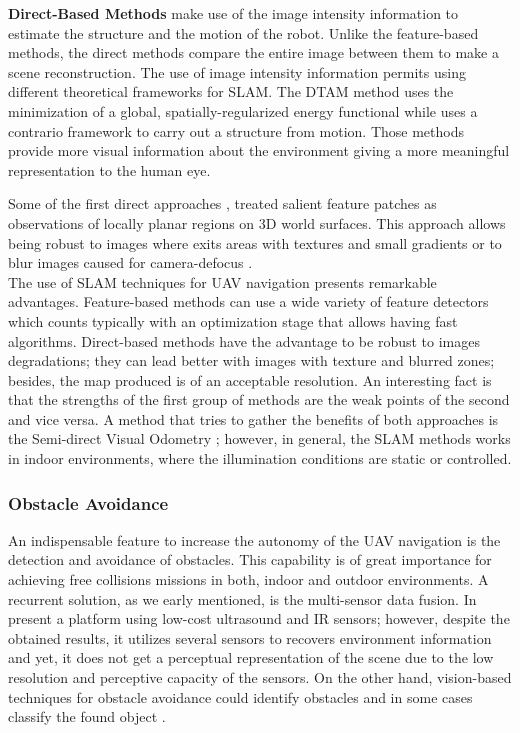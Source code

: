 \textbf{Direct-Based Methods} make use of the image intensity information to estimate the structure and the motion of the robot. Unlike the feature-based methods, the direct methods compare the entire image between them to make a scene reconstruction. The use of image intensity information permits using different theoretical frameworks for SLAM. The DTAM method \cite{Newcombe.Lovegrove.ea:ICCV:2011} uses the minimization of a global, spatially-regularized energy functional while \cite{Moulon.Monasse.ea:ACCV:2012} uses a contrario framework to carry out a structure from motion.
Those methods provide more visual information about the environment giving a more meaningful representation to the human eye. 

Some of the first direct approaches \cite{Jin.Favaro.ea:VC:2003}, \cite{Molton.Davison.ea:BMVC:2004} treated salient feature patches as observations of locally planar regions on 3D world surfaces. This approach allows being robust to images where exits areas with textures and small gradients \cite{Lovegrove.Davison.ea:IVS:2011} or to blur images caused for camera-defocus \cite{Newcombe.Lovegrove.ea:ICCV:2011}.\\

The use of SLAM techniques for UAV navigation presents remarkable advantages. Feature-based methods can use a wide variety of feature detectors which counts typically with an optimization stage that allows having fast algorithms. Direct-based methods have the advantage to be robust to images degradations; they can lead better with images with texture and blurred zones; besides, the map produced is of an acceptable resolution. An interesting fact is that the strengths of the first group of methods are the weak points of the second and vice versa. A method that tries to gather the benefits of both approaches is the Semi-direct Visual Odometry \cite{Forster.Pizzoli.ea:ICRA:2014}; however, in general, the SLAM methods works in indoor environments, where the illumination conditions are static or controlled.\\

\subsubsection{Obstacle Avoidance}

An indispensable feature to increase the autonomy of the UAV navigation is the detection and avoidance of obstacles. This capability is of great importance for achieving free collisions missions in both, indoor and outdoor environments. A recurrent solution, as we early mentioned, is the multi-sensor data fusion. In \cite{Gageik.Benz.ea:ACCESS:2015} present a platform using low-cost ultrasound and IR sensors; however, despite the obtained results, it utilizes several sensors to recovers environment information and yet, it does not get a perceptual representation of the scene due to the low resolution and perceptive capacity of the sensors. On the other hand, vision-based techniques for obstacle avoidance could identify obstacles and in some cases classify the found object \cite{Li.Ye.ea:IROS:2016}. 

